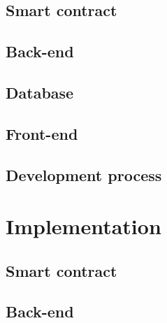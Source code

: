 \documentclass[12pt]{article}
\begin{document}
\subsection{Smart contract}

\subsection{Back-end}

\subsection{Database}

\subsection{Front-end}

\subsection{Development process}

\section{Implementation}

\subsection{Smart contract}

\subsection{Back-end}
\end{document}
